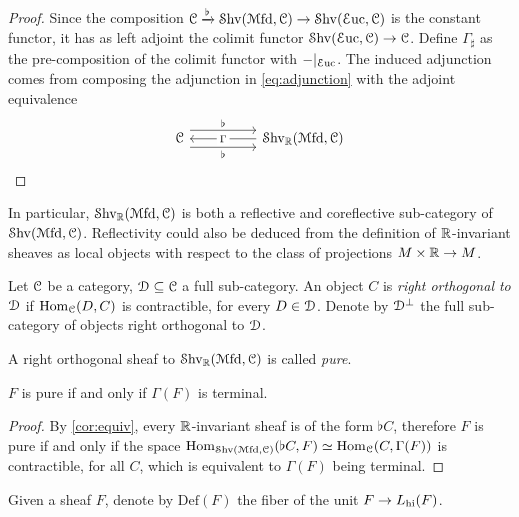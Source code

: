 \documentclass[10pt]{amsart}
\begin{document}
\begin{proof}
  Since the composition $\mathcal{C}\xrightarrow{\flat}\mathcal{S}\mathrm{hv}(\mathcal{M}\mathrm{fd},\mathcal{C})\to\mathcal{S}\mathrm{hv}(\mathcal{E}\mathrm{uc},\mathcal{C})$ is the constant functor, it has as left adjoint the colimit functor $\mathcal{S}\mathrm{hv}(\mathcal{E}\mathrm{uc},\mathcal{C})\to\mathcal{C}$. Define $\Gamma_\sharp$ as the pre-composition of the colimit functor with $-|_{\mathcal{E}\mathrm{uc}}$. The induced adjunction comes from composing the adjunction in \cref{eq:adjunction} with the adjoint equivalence \begin{equation}
    \begin{tikzcd}
      \lC \arrow[rr,shift left=2.5,"\flat"] \arrow[rr,shift right=2.5,"\flat"'] & & \Shv_\bR(\Mfd,\lC) \arrow[ll,"\Gamma" description]
    \end{tikzcd}
  \end{equation}
\end{proof}
\begin{remark}
  In particular, $\mathcal{S}\mathrm{hv}_{\mathbb{R}}(\mathcal{M}\mathrm{fd},\mathcal{C})$ is both a reflective and coreflective sub-category of $\mathcal{S}\mathrm{hv}(\mathcal{M}\mathrm{fd},\mathcal{C})$. Reflectivity could also be deduced from the definition of $\mathbb{R}$-invariant sheaves as local objects with respect to the class of projections $M\times\mathbb{R}\to M$. 
\end{remark}
\begin{definition}
  Let $\mathcal{C}$ be a category, $\mathcal{D}\subseteq\mathcal{C}$ a full sub-category. An object $C$ is \emph{right orthogonal to $\mathcal{D}$} if $\mathrm{Hom}_{\mathcal{C}}(D,C)$ is contractible, for every $D\in\mathcal{D}$. Denote by $\mathcal{D}^\perp$ the full sub-category of objects right orthogonal to $\mathcal{D}$. 
\end{definition}
\begin{definition}
  A right orthogonal sheaf to $\mathcal{S}\mathrm{hv}_{\mathbb{R}}(\mathcal{M}\mathrm{fd},\mathcal{C})$ is called \emph{pure}.
\end{definition}
\begin{lemma}
  $F$ is pure if and only if $\Gamma(F)$ is terminal. 
\end{lemma}
\begin{proof}
  By \cref{cor:equiv}, every $\mathbb{R}$-invariant sheaf is of the form $\flat C$, therefore $F$ is pure if and only if the space $\mathrm{Hom}_{\mathcal{S}\mathrm{hv}(\mathcal{M}\mathrm{fd},\mathcal{C})}(\flat C,F)\simeq\mathrm{Hom}_{\mathcal{C}}(C,\Gamma(F))$ is contractible, for all $C$, which is equivalent to $\Gamma(F)$ being terminal. 
\end{proof}
\begin{definition}
  Given a sheaf $F$, denote by $\mathrm{Def}(F)$ the fiber of the unit $F\to L_{\mathrm{hi}}(F)$. 
\end{definition}
  
\end{document}

